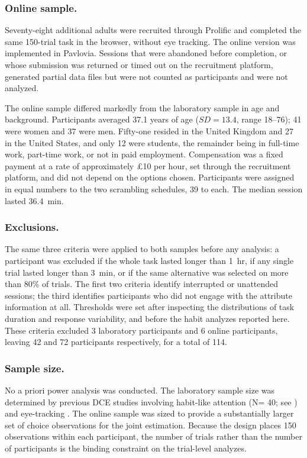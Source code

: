 \documentclass[man,natbib,floatsintext]{apa7}
\begin{document}
\subsubsection{Online sample.} Seventy-eight additional adults were recruited through Prolific and completed the same 150-trial task in the browser, without eye tracking. The online version was implemented in Pavlovia. Sessions that were abandoned before completion, or whose submission was returned or timed out on the recruitment platform, generated partial data files but were not counted as participants and were not analyzed.

The online sample differed markedly from the laboratory sample in age and background. Participants averaged 37.1 years of age ($SD = 13.4$, range 18--76); 41 were women and 37 were men. Fifty-one resided in the United Kingdom and 27 in the United States, and only 12 were students, the remainder being in full-time work, part-time work, or not in paid employment. Compensation was a fixed payment at a rate of approximately \pounds10 per hour, set through the recruitment platform, and did not depend on the options chosen.
Participants were assigned in equal numbers to the two scrambling schedules, 39 to each. The median session lasted 36.4~min.

\subsubsection{Exclusions.} The same three criteria were applied to both samples before any analysis: a participant was excluded if the whole task lasted longer than 1~hr, if any single trial lasted longer than 3~min, or if the same alternative was selected on more than 80\% of trials. The first two criteria identify interrupted or unattended sessions; the third identifies participants who did not engage with the attribute information at all. Thresholds were set after inspecting the distributions of task duration and response variability, and before the habit analyzes reported here. These criteria excluded 3 laboratory participants and 6 online participants, leaving 42 and 72 participants respectively, for a total of 114.

\subsubsection{Sample size.} No a priori power analysis was conducted. The laboratory sample size was determined by previous DCE studies involving habit-like attention (N= 40; see \cite{pool2019}) and eye-tracking . The online sample was sized to provide a substantially larger set of choice observations for the joint estimation. Because the design places 150 observations within each participant, the number of trials rather than the number of participants is the binding constraint on the trial-level analyzes. %
\end{document}
